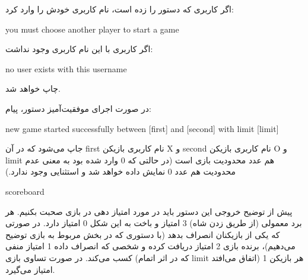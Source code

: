\documentclass[]{article}
\begin{document}
اگر کاربری که دستور را زده است، نام کاربری خودش را وارد کرد:

\begin{tcolorbox}[boxrule=0pt]
	\begin{latin}
  	  \large{
  	  	you must choose another player to start a game
		}
	\end{latin}
\end{tcolorbox}



اگر کاربری با این نام کاربری وجود نداشت:

\begin{tcolorbox}[boxrule=0pt]
	\begin{latin}
  	  \large{
  	  	no user exists with this username
		}
	\end{latin}
\end{tcolorbox}



چاپ خواهد شد.

در صورت اجرای موفقیت‌آمیز دستور، پیام:

\begin{tcolorbox}[boxrule=0pt]
	\begin{latin}
  	  \large{
  	  	new game started successfully between [first] and [second] with limit [limit]
		}
	\end{latin}
\end{tcolorbox}



جاپ می‌شود که در آن first نام کاربری بازیکن X و second نام کاربری بازیکن O و limit هم عدد محدودیت بازی است (در حالتی که 0 وارد شده بود \- به معنی عدم محدودیت\- هم عدد 0 نمایش داده خواهد شد و استثنایی وجود ندارد.)

\hrulefill


\begin{tcolorbox}[boxrule=0pt]
	\begin{latin}
  	  \large{
  	  	scoreboard
		}
	\end{latin}
\end{tcolorbox}



پیش از توضیح خروجی این دستور باید در مورد امتیاز دهی در بازی صحبت بکنیم. هر برد معمولی (از طریق زدن شاه) 3 امتیاز و باخت به این شکل 0 امتیاز دارد. در صورتی که یکی از بازیکنان انصراف بدهد (با دستوری که در بخش مربوط به بازی توضیح می‌دهیم)، برنده بازی 2 امتیاز دریافت کرده و شخصی که انصراف داده 1 امتیاز منفی کسب می‌کند. در صورت تساوی بازی (که در اثر اتمام limit اتفاق می‌افتد) هر بازیکن 1 امتیاز می‌گیرد.
\end{document}
